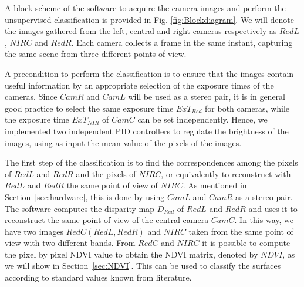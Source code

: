 \documentclass[letterpaper, 10pt, conference]{ieeeconf}      %
\begin{document}

A block scheme of the software to acquire the camera images and perform the unsupervised classification is provided in Fig. \ref{fig:Blockdiagram}. %
We will denote the images gathered from the left, central and right cameras respectively as $RedL$, $NIRC$ and $RedR$.
Each camera collects a frame in the same instant, capturing the same scene from three different points of view. %

A precondition to perform the classification is to ensure that the images contain useful information by an appropriate selection of the exposure times of the cameras.
Since $CamR$ and $CamL$ will be used as a  stereo pair, it is in general good practice to select the same exposure time $ExT_{Red}$ for both cameras, while the exposure time $ExT_{NIR}$ of $CamC$ can be set independently.
Hence, we implemented two independent  PID controllers to regulate the brightness of the images, using as input the mean value of the pixels of the images.



The first step of the classification is to find the correspondences among the pixels of $RedL$ and $RedR$ and the pixels of $NIRC$, or equivalently to reconstruct with $RedL$ and $RedR$ the same point of view of $NIRC$.
%
As mentioned in Section~\ref{sec:hardware}, this is done by using $CamL$ and $CamR$ as a stereo pair.
The software computes the disparity map $D_{Red}$ of $RedL$ and $RedR$ and uses it to reconstruct the same point of view of the central camera $CamC$.
In this way, we have two images $RedC(RedL, RedR)$ and $NIRC$ taken from the same point of view with two different bands.
From $RedC$ and $NIRC$ it is possible to compute the pixel by pixel NDVI value to obtain the NDVI matrix, denoted by $NDVI$, as we will show in Section~\ref{sec:NDVI}.
This can be used to classify the surfaces according to standard values known from literature.
\end{document}
